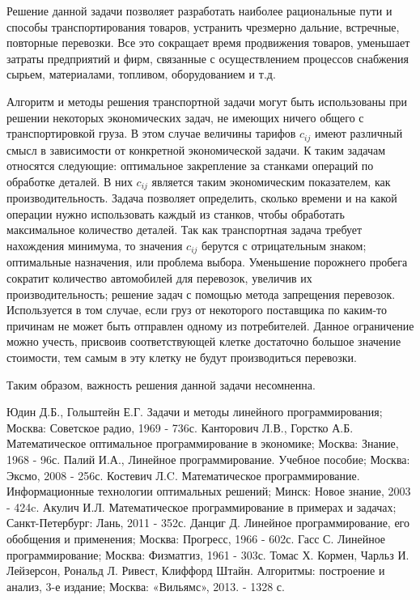 \documentclass[a4paper,12pt]{article}
\begin{document}
	Решение данной задачи позволяет разработать наиболее рациональные пути и способы транспортирования товаров, устранить чрезмерно дальние, встречные, повторные перевозки. Все это сокращает время продвижения товаров, уменьшает затраты предприятий и фирм, связанные с осуществлением процессов снабжения сырьем, материалами, топливом, оборудованием и т.д.
	
	Алгоритм и методы решения транспортной задачи могут быть использованы при решении некоторых экономических задач, не имеющих ничего общего с транспортировкой груза. В этом случае величины тарифов $c_{ij}$ имеют различный смысл в зависимости от конкретной экономической задачи. К таким задачам относятся следующие: оптимальное закрепление за станками операций по обработке деталей. В них $c_{ij}$ является таким экономическим показателем, как производительность. Задача позволяет определить, сколько времени и на какой операции нужно использовать каждый из станков, чтобы обработать максимальное количество деталей. Так как транспортная задача требует нахождения минимума, то значения $c_{ij}$ берутся с отрицательным знаком; оптимальные назначения, или проблема выбора. Уменьшение порожнего пробега сократит количество автомобилей для перевозок, увеличив их производительность; решение задач с помощью метода запрещения перевозок. Используется в том случае, если груз от некоторого поставщика по каким-то причинам не может быть отправлен одному из потребителей. Данное ограничение можно учесть, присвоив соответствующей клетке достаточно большое значение стоимости, тем самым в эту клетку не будут производиться перевозки. 
	
	Таким образом, важность решения данной задачи несомненна.
	
	\clearpage
	
\begin{thebibliography}{99}
	Юдин Д.Б., Гольштейн Е.Г. Задачи и методы линейного программирования;
	Москва: Советское радио, 1969 - 736с.
	Канторович Л.В., Горстко А.Б. Математическое оптимальное программирование  в экономике;
	Москва: Знание, 1968 - 96с.
	Палий И.А., Линейное программирование. Учебное пособие;
	Москва: Эксмо, 2008 - 256с.
	Костевич Л.C. Математическое программирование. Информационные технологии оптимальных решений;
	Минск: Новое знание, 2003 - 424c.
	Акулич И.Л. Математическое программирование в примерах и задачах; Санкт-Петербург: Лань, 2011 - 352с.
	Данциг Д. Линейное программирование, его обобщения и применения; Москва: Прогресс, 1966 - 602с.
	Гасс С. Линейное программирование; Москва: Физматгиз, 1961 - 303с.
	Томас Х. Кормен, Чарльз И. Лейзерсон, Рональд Л. Ривест, Клиффорд Штайн. Алгоритмы: построение и анализ, 3-е издание; Москва: «Вильямс», 2013. - 1328 с.
\end{thebibliography}
\end{document}
